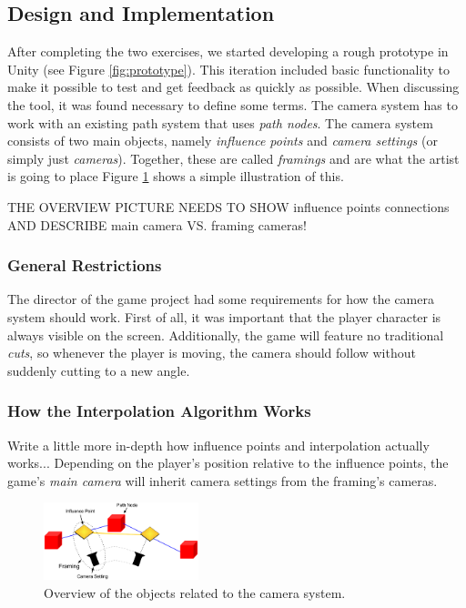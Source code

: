 \subsection{Design and Implementation}
After completing the two exercises, we started developing a rough prototype in Unity (see Figure \ref{fig:prototype}). This iteration included basic functionality to make it possible to test and get feedback as quickly as possible. When discussing the tool, it was found necessary to define some terms. The camera system has to work with an existing path system that uses \textit{path nodes}. The camera system consists of two main objects, namely \textit{influence points} and \textit{camera settings} (or simply just \textit{cameras}). Together, these are called \textit{framings} and are what the artist is going to place Figure \ref{fig:manual_overview} shows a simple illustration of this.

THE OVERVIEW PICTURE NEEDS TO SHOW influence points connections AND DESCRIBE main camera VS. framing cameras!

\subsubsection{General Restrictions}
The director of the game project had some requirements for how the camera system should work. First of all, it was important that the player character is always visible on the screen. Additionally, the game will feature no traditional \textit{cuts}, so whenever the player is moving, the camera should follow without suddenly cutting to a new angle.

\subsubsection{How the Interpolation Algorithm Works}
Write a little more in-depth how influence points and interpolation actually works...
Depending on the player's position relative to the influence points, the game's \textit{main camera} will inherit camera settings from the framing's cameras.


\begin{figure}[htbp]
\centering
\includegraphics[width=0.40\textwidth]{Pics/manual_overview}
\caption{Overview of the objects related to the camera system.}
\label{fig:manual_overview}
\end{figure}


